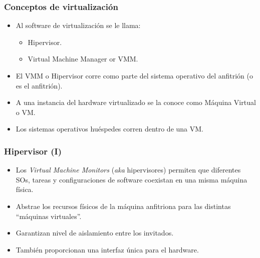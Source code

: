 \documentclass{beamer}
\begin{document}


\begin{frame}
\frametitle{Conceptos de virtualización}

\begin{itemize}
\item Al software de virtualización se le llama:
	\begin{itemize}
	\item  \alert{Hipervisor}.
	\item  \alert{Virtual Machine Manager} or \alert{VMM}.
	\end{itemize}
\item El VMM o Hipervisor corre como parte del sistema operativo del anfitrión (o es el anfitrión).
\item A una instancia del hardware virtualizado se la conoce como \alert{Máquina Virtual} o \alert{VM}.
\item Los sistemas operativos huéspedes corren dentro de una VM.
\end{itemize}

\end{frame}



\begin{frame}
\frametitle{Hipervisor (I)}

\begin{itemize}
\item Los \textit{Virtual Machine Monitors} (\textit{aka} \alert{hipervisores}) permiten que diferentes SOs, tareas y configuraciones de software coexistan en una misma máquina física.
\item Abstrae los recursos físicos de la máquina anfitriona para las distintas ``máquinas virtuales''.
\item Garantizan nivel de aislamiento entre los invitados.
\item También proporcionan una interfaz única para el hardware.
\end{itemize}

\end{frame}

\end{document}
